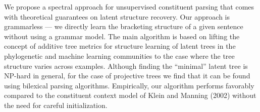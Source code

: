We propose a spectral approach for unsupervised constituent parsing that comes with theoretical guarantees on latent structure recovery. Our approach is grammarless --- we directly learn the bracketing structure of a given sentence without using a grammar model. The main algorithm is based on lifting the concept of additive tree metrics for structure learning of latent trees in the phylogenetic and machine learning communities to the case where the tree structure varies across examples. Although finding the ``minimal'' latent tree is NP-hard in general, for the case of projective trees we find that it can be found using bilexical parsing algorithms. Empirically, our algorithm performs favorably compared to the constituent context model of Klein and Manning (2002) without the need for careful initialization.
